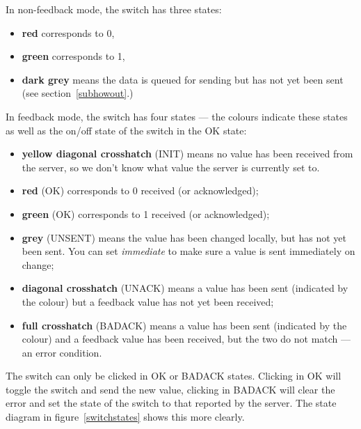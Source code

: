 In non-feedback mode, the switch has three states:
\begin{itemize}
\item \textbf{red} corresponds to 0,
\item \textbf{green} corresponds to 1,
\item \textbf{dark grey} means the data is queued for sending but has not yet been sent (see section~\ref{subhowout}.)
\end{itemize}
In feedback mode, the switch has four states --- the colours indicate these states as well
as the on/off state of the switch in the OK state:
\begin{itemize}
\item \textbf{yellow diagonal crosshatch} (INIT) means no value has been received from the server,
so we don't know what value the server is currently set to.
\item \textbf{red} (OK) corresponds to 0 received (or acknowledged);
\item \textbf{green} (OK) corresponds to 1 received (or acknowledged);
\item \textbf{grey} (UNSENT) means the value has been changed locally, but has not yet been sent. You can set \emph{immediate} to
make sure a value is sent immediately on change;
\item \textbf{diagonal crosshatch} (UNACK) means a value has been sent (indicated by the colour) but a feedback value has
not yet been received;
\item \textbf{full crosshatch} (BADACK) means a value has been sent (indicated by the colour) and a feedback value has
been received, but the two do not match --- an error condition.
\end{itemize}
The switch can only be clicked in OK or BADACK states. Clicking in OK will toggle the switch and
send the new value, clicking in BADACK will clear the error and set the state of the switch
to that reported by the server. The state diagram in figure~\ref{switchstates} shows this
more clearly.
